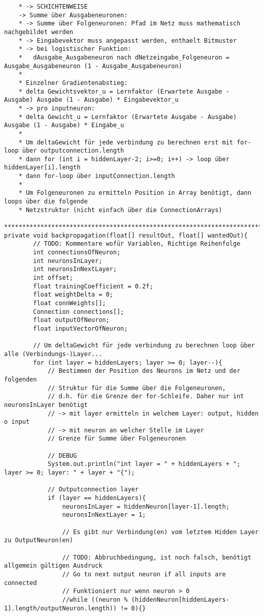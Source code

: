\begin{lstlisting}
	* -> SCHICHTENWEISE
	-> Summe über Ausgabeneuronen:
	* -> Summe über Folgeneuronen: Pfad im Netz muss mathematisch nachgebildet werden
	* -> Eingabevektor muss angepasst werden, enthaelt Bitmuster
	* -> bei logistischer Funktion:
	*	dAusgabe_Ausgabeneuron nach dNetzeingabe_Folgeneuron = Ausgabe_Ausgabeneuron (1 - Ausgabe_Ausgabeneuron)
	*
	* Einzelner Gradientenabstieg:
	* delta Gewichtsvektor_u = Lernfaktor (Erwartete Ausgabe - Ausgabe) Ausgabe (1 - Ausgabe) * Eingabevektor_u
	* -> pro inputneuron:
	* delta Gewicht_u = Lernfaktor (Erwartete Ausgabe - Ausgabe) Ausgabe (1 - Ausgabe) * Eingabe_u
	*
	* Um deltaGewicht für jede verbindung zu berechnen erst mit for-loop über outputconnection.length
	* dann for (int i = hiddenLayer-2; i>=0; i++) -> loop über hiddenLayer[i].length
	* dann for-loop über inputConnection.length
	*
	* Um Folgeneuronen zu ermitteln Position in Array benötigt, dann loops über die folgende
	* Netzstruktur (nicht einfach über die ConnectionArrays)
	****************************************************************************************/
private	void backpropagation(float[] resultOut, float[] wantedOut){
		// TODO: Kommentare wofür Variablen, Richtige Reihenfolge
		int connectionsOfNeuron;
		int neuronsInLayer;
		int neuronsInNextLayer;
		int offset;
		float trainingCoefficient = 0.2f;
		float weightDelta = 0;
		float connWeights[];
		Connection connections[];
		float outputOfNeuron;
		float inputVectorOfNeuron;
		
		// Um deltaGewicht für jede verbindung zu berechnen loop über alle (Verbindungs-)Layer...
		for (int layer = hiddenLayers; layer >= 0; layer--){
			// Bestimmen der Position des Neurons im Netz und der folgenden
			// Struktur für die Summe über die Folgeneuronen,
			// d.h. für die Grenze der for-Schleife. Daher nur int neuronsInLayer benötigt
			// -> mit layer ermitteln in welchem Layer: output, hidden o input
			// -> mit neuron an welcher Stelle im Layer
			// Grenze für Summe über Folgeneuronen
			
			// DEBUG
			System.out.println("int layer = " + hiddenLayers + "; layer >= 0; layer: " + layer + "{");
			
			// Outputconnection layer
			if (layer == hiddenLayers){
				neuronsInLayer = hiddenNeuron[layer-1].length;
				neuronsInNextLayer = 1;
				
				// Es gibt nur Verbindung(en) vom letztem Hidden Layer zu OutputNeuron(en)
				
				// TODO: Abbruchbedingung, ist noch falsch, benötigt allgemein gültigen Ausdruck
				// Go to next output neuron if all inputs are connected
				// Funktioniert nur wenn neuron > 0
				//while ((neuron % (hiddenNeuron[hiddenLayers-1].length/outputNeuron.length)) != 0){}
				

\end{lstlisting}
